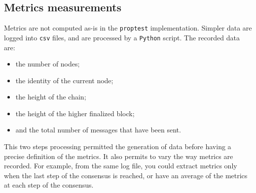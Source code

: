 \subsection{Metrics measurements}
Metrics are not computed as-is in the \texttt{proptest} implementation. Simpler
data are logged into \texttt{csv} files, and are processed by a \texttt{Python}
script. The recorded data are: 

\begin{itemize}
    \item the number of nodes;
    \item the identity of the current node;
    \item the height of the chain;
    \item the height of the higher finalized block;
    \item and the total number of messages that have been sent.
\end{itemize}

This two steps processing permitted the generation of
data before having a precise definition of the metrics. It also permits to vary
the way metrics are recorded. For example, from the same log file, you could
extract metrics only when the last step of the consensus is reached, or have an
average of the metrics at each step of the consensus.
